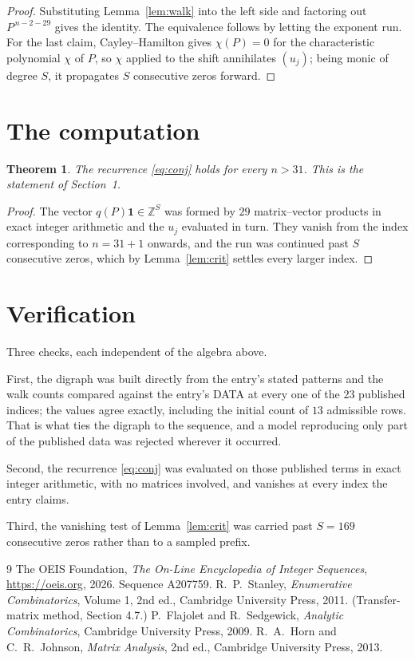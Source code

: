 \documentclass[11pt,a4paper]{article}
\theoremstyle{plain}
\newtheorem{theorem}{Theorem}
\theoremstyle{definition}
\begin{document}
\begin{proof}
Substituting Lemma~\ref{lem:walk} into the left side and factoring out
$P^{\,n-2-29}$ gives the identity. The equivalence follows by letting the exponent
run. For the last claim, Cayley--Hamilton gives $\chi(P)=0$ for the characteristic
polynomial $\chi$ of $P$, so $\chi$ applied to the shift annihilates $(u_j)$; being monic of
degree $S$, it propagates $S$ consecutive zeros forward.
\end{proof}

\section{The computation}

\begin{theorem}
The recurrence \eqref{eq:conj} holds for every $n>31$. This is the statement of
Section~1.
\end{theorem}

\begin{proof}
The vector $q(P)\mathbf{1}\in\mathbb{Z}^{S}$ was formed by $29$ matrix--vector
products in exact integer arithmetic and the $u_j$ evaluated in turn. They vanish from the
index corresponding to $n=31+1$ onwards, and the run was continued past $S$ consecutive
zeros, which by Lemma~\ref{lem:crit} settles every larger index.
\end{proof}

\section{Verification}

Three checks, each independent of the algebra above.

First, the digraph was built directly from the entry's stated patterns and the walk counts
compared against the entry's DATA at every one of the $23$ published indices; the
values agree exactly, including the initial count of $13$ admissible rows. That is
what ties the digraph to the sequence, and a model reproducing only part of the published
data was rejected wherever it occurred.

Second, the recurrence \eqref{eq:conj} was evaluated on those published terms in exact
integer arithmetic, with no matrices involved, and vanishes at every index the entry claims.

Third, the vanishing test of Lemma~\ref{lem:crit} was carried past $S=169$ consecutive
zeros rather than to a sampled prefix.

\begin{thebibliography}{9}
 The OEIS Foundation, \emph{The On-Line Encyclopedia of Integer
Sequences}, \url{https://oeis.org}, 2026. Sequence A207759.
 R.~P.~Stanley, \emph{Enumerative Combinatorics}, Volume 1, 2nd ed.,
Cambridge University Press, 2011. (Transfer-matrix method, Section 4.7.)
 P.~Flajolet and R.~Sedgewick, \emph{Analytic Combinatorics}, Cambridge
University Press, 2009.
 R.~A.~Horn and C.~R.~Johnson, \emph{Matrix Analysis}, 2nd ed., Cambridge
University Press, 2013.
\end{thebibliography}
\end{document}
